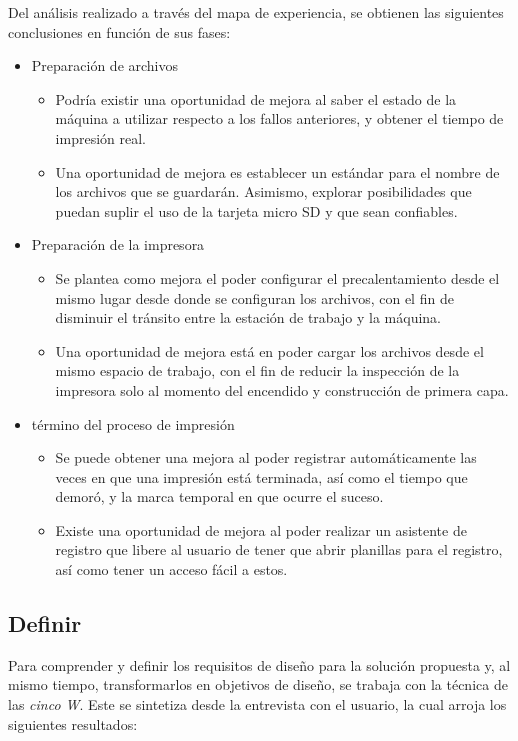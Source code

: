 Del análisis realizado a través del mapa de experiencia, se obtienen las siguientes conclusiones en función de sus fases:

\begin{itemize}
\item Preparación de archivos
\begin{itemize}
\item Podría existir una oportunidad de mejora al saber el estado de la máquina a utilizar respecto a los fallos anteriores, y obtener el tiempo de impresión real.
\item Una oportunidad de mejora es establecer un estándar para el nombre de los archivos que se guardarán. Asimismo, explorar posibilidades que puedan suplir el uso de la tarjeta micro SD y que sean confiables.
\end{itemize}
\item Preparación de la impresora
\begin{itemize}
\item Se plantea como mejora el poder configurar el precalentamiento desde el mismo lugar desde donde se configuran los archivos, con el fin de disminuir el tránsito entre la estación de trabajo y la máquina.
\item Una oportunidad de mejora está en poder cargar los archivos desde el mismo espacio de trabajo, con el fin de reducir la inspección de la impresora solo al momento del encendido y construcción de primera capa.
\end{itemize}
\item término del proceso de impresión
\begin{itemize}
\item Se puede obtener una mejora al poder registrar automáticamente las veces en que una impresión está terminada, así como el tiempo que demoró, y la marca temporal en que ocurre el suceso.
\item Existe una oportunidad de mejora al poder realizar un asistente de registro que libere al usuario de tener que abrir planillas para el registro, así como tener un acceso fácil a estos. 
\end{itemize}
\end{itemize}

\subsection{Definir}
Para comprender y definir los requisitos de diseño para la solución propuesta y, al mismo tiempo, transformarlos en objetivos de diseño, se trabaja con la técnica de las \textit{cinco W}. Este se sintetiza desde la entrevista con el usuario, la cual arroja los siguientes resultados:


